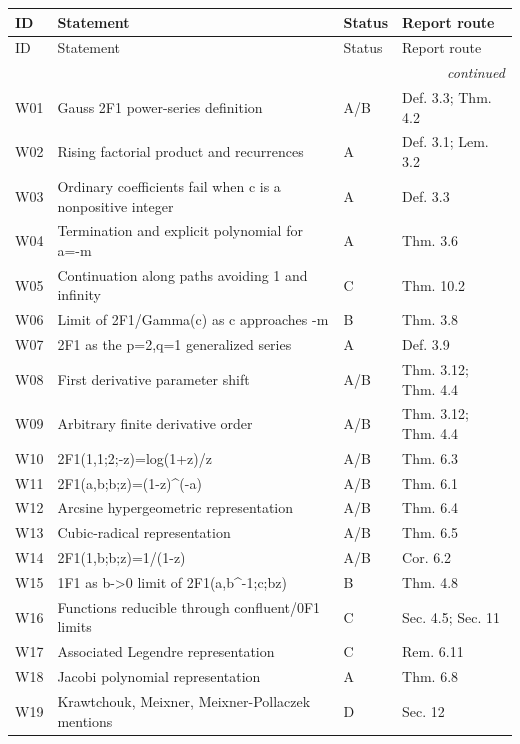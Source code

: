 \begin{longtable}{@{}p{}p{}p{}p{}@{}}
\toprule ID & Statement & Status & Report route \\
\midrule\endfirsthead
\toprule ID & Statement & Status & Report route \\
\midrule\endhead
\midrule\multicolumn{4}{r}{\emph{continued}}\\\endfoot
\bottomrule\endlastfoot
W01 & Gauss 2F1 power-series definition & \textsf{A/B} & Def. 3.3; Thm. 4.2 \\
W02 & Rising factorial product and recurrences & \textsf{A} & Def. 3.1; Lem. 3.2 \\
W03 & Ordinary coefficients fail when c is a nonpositive integer & \textsf{A} & Def. 3.3 \\
W04 & Termination and explicit polynomial for a=-m & \textsf{A} & Thm. 3.6 \\
W05 & Continuation along paths avoiding 1 and infinity & \textsf{C} & Thm. 10.2 \\
W06 & Limit of 2F1/Gamma(c) as c approaches -m & \textsf{B} & Thm. 3.8 \\
W07 & 2F1 as the p=2,q=1 generalized series & \textsf{A} & Def. 3.9 \\
W08 & First derivative parameter shift & \textsf{A/B} & Thm. 3.12; Thm. 4.4 \\
W09 & Arbitrary finite derivative order & \textsf{A/B} & Thm. 3.12; Thm. 4.4 \\
W10 & 2F1(1,1;2;-z)=log(1+z)/z & \textsf{A/B} & Thm. 6.3 \\
W11 & 2F1(a,b;b;z)=(1-z)\textasciicircum{}(-a) & \textsf{A/B} & Thm. 6.1 \\
W12 & Arcsine hypergeometric representation & \textsf{A/B} & Thm. 6.4 \\
W13 & Cubic-radical representation & \textsf{A/B} & Thm. 6.5 \\
W14 & 2F1(1,b;b;z)=1/(1-z) & \textsf{A/B} & Cor. 6.2 \\
W15 & 1F1 as b->0 limit of 2F1(a,b\textasciicircum{}-1;c;bz) & \textsf{B} & Thm. 4.8 \\
W16 & Functions reducible through confluent/0F1 limits & \textsf{C} & Sec. 4.5; Sec. 11 \\
W17 & Associated Legendre representation & \textsf{C} & Rem. 6.11 \\
W18 & Jacobi polynomial representation & \textsf{A} & Thm. 6.8 \\
W19 & Krawtchouk, Meixner, Meixner-Pollaczek mentions & \textsf{D} & Sec. 12 \\

\end{longtable}
